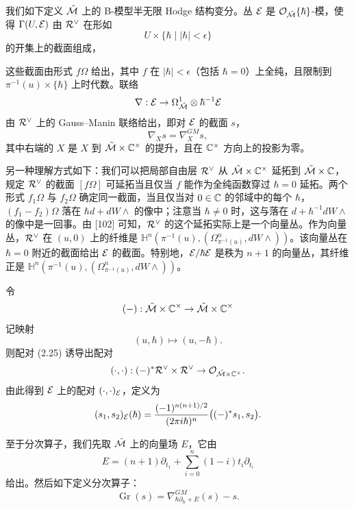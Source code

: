 
\begin{definition}
我们如下定义 $\tilde{\mathcal{M}}$ 上的 B-模型半无限 Hodge 结构变分。丛 $\mathcal{E}$ 是 $\mathcal{O}_{\tilde{\mathcal{M}}}\{\hbar\}$-模，使得 $\Gamma(U,\mathcal{E})$ 由 $\mathcal{R}^\vee$ 在形如
\[
  U\times\{\hbar\mid|\hbar|<\epsilon\}
\]
的开集上的截面组成，

这些截面由形式 $f\Omega$ 给出，其中 $f$ 在 $|\hbar|<\epsilon$（包括 $\hbar=0$）上全纯，且限制到 $\pi^{-1}(u)\times\{\hbar\}$ 上时代数。联络
\[
  \nabla:\mathcal{E}\to\Omega^1_{\tilde{\mathcal{M}}}\otimes\hbar^{-1}\mathcal{E}
\]
由 $\mathcal{R}^\vee$ 上的 Gauss--Manin 联络给出，即对 $\mathcal{E}$ 的截面 $s$，
\[
  \nabla_Xs=\nabla^{GM}_Xs,
\]
其中右端的 $X$ 是 $X$ 到 $\tilde{\mathcal{M}}\times\mathbb{C}^\times$ 的提升，且在 $\mathbb{C}^\times$ 方向上的投影为零。
\end{definition}

另一种理解方式如下：我们可以把局部自由层 $\mathcal{R}^\vee$ 从 $\tilde{\mathcal{M}}\times\mathbb{C}^\times$ 延拓到 $\tilde{\mathcal{M}}\times\mathbb{C}$，规定 $\mathcal{R}^\vee$ 的截面 $[f\Omega]$ 可延拓当且仅当 $f$ 能作为全纯函数穿过 $\hbar=0$ 延拓。两个形式 $f_1\Omega$ 与 $f_2\Omega$ 确定同一截面，当且仅当对 $0\in\mathbb{C}$ 的邻域中的每个 $\hbar$，$(f_1-f_2)\Omega$ 落在 $\hbar d+dW\wedge$ 的像中；注意当 $\hbar\ne0$ 时，这与落在 $d+\hbar^{-1}dW\wedge$ 的像中是一回事。由 [102] 可知，$\mathcal{R}^\vee$ 的这个延拓实际上是一个向量丛。作为向量丛，$\mathcal{R}^\vee$ 在 $(u,0)$ 上的纤维是 $\mathbb{H}^n(\pi^{-1}(u),(\Omega^{n}_{\pi^{-1}(u)},dW\wedge))$。该向量丛在 $\hbar=0$ 附近的截面给出 $\mathcal{E}$ 的截面。特别地，$\mathcal{E}/\hbar\mathcal{E}$ 是秩为 $n+1$ 的向量丛，其纤维正是 $\mathbb{H}^n(\pi^{-1}(u),(\Omega^{n}_{\pi^{-1}(u)},dW\wedge))$。

令
\[
  (-):\tilde{\mathcal{M}}\times\mathbb{C}^\times\to\tilde{\mathcal{M}}\times\mathbb{C}^\times
\]
记映射
\[
  (u,\hbar)\mapsto(u,-\hbar).
\]
则配对 (2.25) 诱导出配对
\[
  (\cdot,\cdot):(-)^*\mathcal{R}^\vee\times\mathcal{R}^\vee\to\mathcal{O}_{\tilde{\mathcal{M}}\times\mathbb{C}^\times}.
\]
由此得到 $\mathcal{E}$ 上的配对 $(\cdot,\cdot)_{\mathcal{E}}$，定义为
\[
  (s_1,s_2)_{\mathcal{E}}(\hbar)
  =\frac{(-1)^{n(n+1)/2}}{(2\pi i\hbar)^n}\bigl((-)^*s_1,s_2\bigr).
\]

至于分次算子，我们先取 $\tilde{\mathcal{M}}$ 上的向量场 $E$，它由
\[
  E=(n+1)\partial_{t_1}+\sum_{i=0}^{n}(1-i)t_i\partial_{t_i}
\]
给出。然后如下定义分次算子：
\begin{equation}
  \operatorname{Gr}(s)=\nabla^{GM}_{\hbar\partial_\hbar+E}(s)-s. \tag{2.32}
\end{equation}

